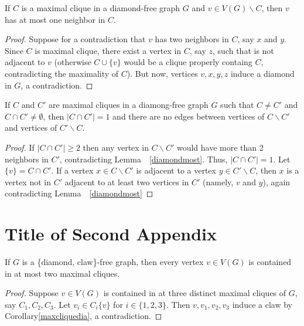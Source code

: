 \documentclass[12pt,a4paper,titlepage,openany]{report}
\begin{document}
\begin{lemma}\label{diamondmost}
If $C$ is a maximal clique in a diamond-free graph $G$ and $v\in V(G)\backslash C$, then $v$ has at most one neighbor in $C$.
\end{lemma}
\begin{proof}
Suppose for a contradiction that $v$ has two neighbors in $C$, say $x$ and $y$. Since $C$ is maximal clique, there exist a vertex in $C$, say $z$, such that is not adjacent to $v$ (otherwise $C\cup \{v\}$ would be a clique properly containg $C$, contradicting the maximality of $C$). But now, vertices $v,x,y,z$ induce a diamond in $G$, a contradiction. 
\end{proof}
\begin{corollary}\label{maxcliquedia}
If $C$ and $C'$ are maximal cliques in a diamong-free graph $G$ such that $C\neq C'$ and $C\cap C'\neq \emptyset$, then $|C\cap C'|= 1$ and there are no edges between vertices of $C\backslash C'$ and vertices of $C'\backslash C$.
\end{corollary}
\begin{proof}
If $|C\cap C'|\geq 2$ then any vertex in $C\backslash C'$ would have more than 2 neighbors in $C'$, contradicting Lemma~~\ref{diamondmost}. Thus, $|C\cap C'|=1$. Let $\{v\}= C\cap C'$. If a vertex $x\in C\backslash C'$ is adjacent to a vertex $y\in C'\backslash C$, then $x$ is a vertex not in $C'$ adjacent to at least two vertices in $C'$ (namely, $v$ and $y$), again contradicting Lemma~~\ref{diamondmost}
\end{proof}

\chapter{Title of Second Appendix}
\thispagestyle{empty}

\begin{corollary}
If $G$ is a \{diamond, claw\}-free graph, then every vertex $v\in V(G)$ is contained in at most two maximal cliques.
\end{corollary}

\begin{proof}
Suppose $v\in V(G)$ is contained in at three distinct maximal cliques of $G$, say $C_1,C_2,C_3$. Let $v_i\in C_i\{v\}$ for $i\in \{1,2,3\}$. Then $v,v_1,v_2,v_3$ induce a claw by Corollary\ref{maxcliquedia}, a contradiction.
\end{proof}


\end{document}
